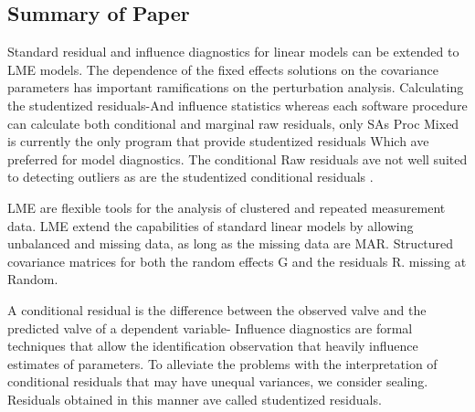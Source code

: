 \documentclass[12pt, a4paper]{article}
\begin{document}
\subsection{Summary of Paper}

Standard residual and influence diagnostics for linear models can be extended to LME models.
The dependence of the fixed effects solutions on the covariance parameters has important ramifications on the perturbation analysis.	
Calculating the studentized residuals-And influence statistics whereas each software procedure can calculate both conditional and marginal raw residuals, only SAs Proc Mixed is currently the only program that provide studentized residuals Which ave preferred for model diagnostics. The conditional Raw residuals ave not well suited to detecting outliers as are the studentized conditional residuals \citep{schabenberger}.


LME are flexible tools for the analysis of clustered and repeated measurement data. LME extend the capabilities of standard linear models by allowing unbalanced and missing data, as long as the missing data are MAR. Structured covariance matrices for both the random effects G and the residuals R. missing at Random.

A conditional residual is the difference between the observed valve and the predicted valve of a dependent variable- Influence diagnostics are formal techniques that allow the identification observation that heavily influence estimates of parameters.
To alleviate the problems with the interpretation of conditional residuals that may have unequal variances, we consider sealing.
Residuals obtained in this manner ave called studentized residuals.
\end{document}
